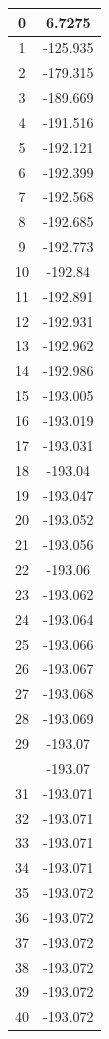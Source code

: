 \documentclass[12pt,a4paper]{article}
\numberwithin{equation}{section}
\numberwithin{figure}{section}
\numberwithin{table}{section}
\begin{document}
\begin{longtable}{|c|c|}
0 & 6.7275 \\ \hline
1 & -125.935 \\ \hline
2 & -179.315 \\ \hline
3 & -189.669 \\ \hline
4 & -191.516 \\ \hline
5 & -192.121 \\ \hline
6 & -192.399 \\ \hline
7 & -192.568 \\ \hline
8 & -192.685 \\ \hline
9 & -192.773 \\ \hline
10 & -192.84 \\ \hline
11 & -192.891 \\ \hline
12 & -192.931 \\ \hline
13 & -192.962 \\ \hline
14 & -192.986 \\ \hline
15 & -193.005 \\ \hline
16 & -193.019 \\ \hline
17 & -193.031 \\ \hline
18 & -193.04 \\ \hline
19 & -193.047 \\ \hline
20 & -193.052 \\ \hline
21 & -193.056 \\ \hline
22 & -193.06 \\ \hline
23 & -193.062 \\ \hline
24 & -193.064 \\ \hline
25 & -193.066 \\ \hline
26 & -193.067 \\ \hline
27 & -193.068 \\ \hline
28 & -193.069 \\ \hline
29 & -193.07 \\ \hline
\pagebreak
30 & -193.07 \\ \hline
31 & -193.071 \\ \hline
32 & -193.071 \\ \hline
33 & -193.071 \\ \hline
34 & -193.071 \\ \hline
35 & -193.072 \\ \hline
36 & -193.072 \\ \hline
37 & -193.072 \\ \hline
38 & -193.072 \\ \hline
39 & -193.072 \\ \hline
40 & -193.072 \\ \hline

\end{longtable}
\end{document}

